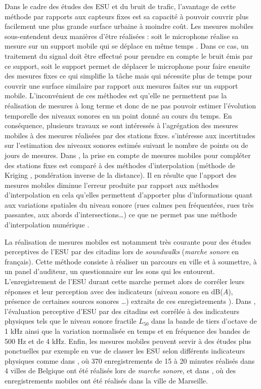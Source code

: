 Dans le cadre des études des ESU et du bruit de trafic, l'avantage de cette méthode par rapports aux capteurs fixes est sa capacité à pouvoir couvrir plus facilement une plus grande surface urbaine à moindre coût. Les mesures mobiles sous-entendent deux manières d'être réalisées : soit le microphone réalise sa mesure sur un support mobile qui se déplace en même temps \cite{alsina-pages_design_2016}. Dans ce cas, un traitement du signal doit être effectué pour prendre en compte le bruit émis par ce support, soit le support permet de déplacer le microphone pour faire ensuite des mesures fixes \cite{manvell2004sadmam} ce qui simplifie la tâche mais qui nécessite plus de temps pour couvrir une surface similaire par rapport aux mesures faites sur un support mobile. 
L'inconvénient de ces méthodes est qu'elle ne permettent pas la réalisation de mesures à long terme et donc de ne pas pouvoir estimer l'évolution temporelle des niveaux sonores en un point donné au cours du temps.
En conséquence, plusieurs travaux se sont intéressés à l'agrégation des mesures mobiles à des mesures réalisées par des stations fixes.
\cite{morillas2014uncertainty} s'intéresse aux incertitudes sur l'estimation des niveaux sonores estimés suivant le nombre de points ou de jours de mesures. Dans \cite{can_measurement_2014}, la prise en compte de mesures mobiles pour compléter des stations fixes est comparé à des méthodes d'interpolation (méthode de Kriging , pondération inverse de la distance). Il en résulte que l'apport des mesures mobiles diminue l'erreur produite par rapport aux méthodes d'interpolation en cela qu'elles permettent d'apporter plus d'informations quant aux variations spatiales du niveau sonore (rues calmes peu fréquentées, rues très passantes, aux abords d'intersections\dots) ce que ne permet pas une méthode d'interpolation numérique \cite{aumond2018kriging}.

La réalisation de mesures mobiles est notamment très courante pour des études perceptives de l'ESU par des citadins lors de \textit{soundwalks} (\textit{marche sonore} en français). Cette méthode consiste à réaliser un parcours en ville et à soumettre, à un panel d'auditeur, un questionnaire sur les sons qui les entourent. L'enregistrement de l'ESU durant cette marche permet alors de corréler leurs réponses et leur perception avec des indicateurs (niveau sonore en dB($A$), présence de certaines sources sonores \dots{}) extraits de ces enregistrements \cite{brocolini_measurements_2013, hong2013designing}). Dans \cite{aumond2017modeling}, l'évaluation perceptive d'ESU par des citadins est corrélée à des indicateurs physiques tels que le niveau sonore fractile $L_{50}$ dans la bande de tiers d'octave de 1 kHz ainsi que la variation normalisée en temps et en fréquence des bandes de 500 Hz et de 4 kHz.
Enfin, les mesures mobiles peuvent servir à des études plus ponctuelles par exemple en vue de classer les ESU selon différents indicateurs physiques comme dans \cite{rychtarikova2013soundscape}, où 370 enregistrements de 15 à 20 minutes réalisés dans 4 villes de Belgique ont été réalisés lors de \textit{marche sonore}, et dans \cite{can_describing_2015}, où des enregistrements mobiles ont été réalisés dans la ville de Marseille.


